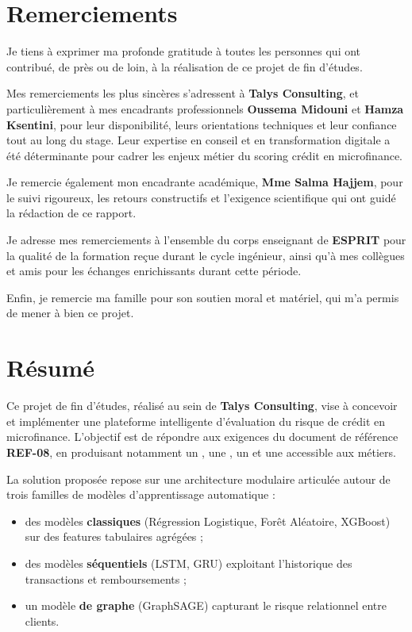 \setcounter{page}{1}

\chapter*{Remerciements}

Je tiens à exprimer ma profonde gratitude à toutes les personnes qui ont contribué, de près ou de loin, à la réalisation de ce projet de fin d'études.

Mes remerciements les plus sincères s'adressent à \textbf{Talys Consulting}, et particulièrement à mes encadrants professionnels \textbf{Oussema Midouni} et \textbf{Hamza Ksentini}, pour leur disponibilité, leurs orientations techniques et leur confiance tout au long du stage. Leur expertise en conseil et en transformation digitale a été déterminante pour cadrer les enjeux métier du scoring crédit en microfinance.

Je remercie également mon encadrante académique, \textbf{Mme Salma Hajjem}, pour le suivi rigoureux, les retours constructifs et l'exigence scientifique qui ont guidé la rédaction de ce rapport.

Je adresse mes remerciements à l'ensemble du corps enseignant de \textbf{ESPRIT} pour la qualité de la formation reçue durant le cycle ingénieur, ainsi qu'à mes collègues et amis pour les échanges enrichissants durant cette période.

Enfin, je remercie ma famille pour son soutien moral et matériel, qui m'a permis de mener à bien ce projet.

\vfill

\chapter*{Résumé}

Ce projet de fin d'études, réalisé au sein de \textbf{Talys Consulting}, vise à concevoir et implémenter une plateforme intelligente d'évaluation du risque de crédit en microfinance. L'objectif est de répondre aux exigences du document de référence \textbf{REF-08}, en produisant notamment un , une , un  et une  accessible aux métiers.

La solution proposée repose sur une architecture modulaire articulée autour de trois familles de modèles d'apprentissage automatique :
\begin{itemize}[leftmargin=*]
  \item des modèles \textbf{classiques} (Régression Logistique, Forêt Aléatoire, XGBoost) sur des features tabulaires agrégées ;
  \item des modèles \textbf{séquentiels} (LSTM, GRU) exploitant l'historique des transactions et remboursements ;
  \item un modèle \textbf{de graphe} (GraphSAGE) capturant le risque relationnel entre clients.
\end{itemize}

